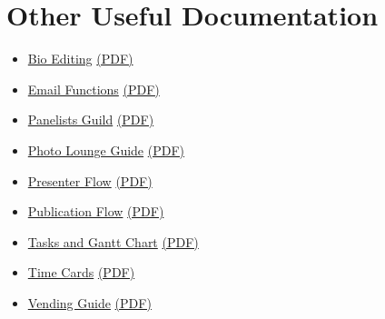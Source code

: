 \documentclass[captions=tablesignature]{scrartcl}
\begin{document}
\section{Other Useful Documentation}
\label{sec-17}
\begin{itemize}
\item \href{./Bio_Editing.html}{Bio Editing} \href{./Bio_Editing.pdf}{(PDF)}
\item \href{./Email_Functions.html}{Email Functions} \href{./Email_Functions.pdf}{(PDF)}
\item \href{./Panelists_Guide.html}{Panelists Guild} \href{./Panelists_Guide.pdf}{(PDF)}
\item \href{./Photo_Lounge.html}{Photo Lounge Guide} \href{./Photo_Lounge.pdf}{(PDF)}
\item \href{./Presenter_Flow.html}{Presenter Flow} \href{./Presenter_Flow.pdf}{(PDF)}
\item \href{./Publication_Flow.html}{Publication Flow} \href{./Publication_Flow.pdf}{(PDF)}
\item \href{./Tasks-Gantt_Chart.html}{Tasks and Gantt Chart} \href{./Tasks-Gantt_Chart.pdf}{(PDF)}
\item \href{./Time_Card.html}{Time Cards} \href{./Time_Card.pdf}{(PDF)}
\item \href{./Vending_Design_Document.html}{Vending Guide} \href{./Vending_Design_Document.pdf}{(PDF)}
\end{itemize}
\end{document}
